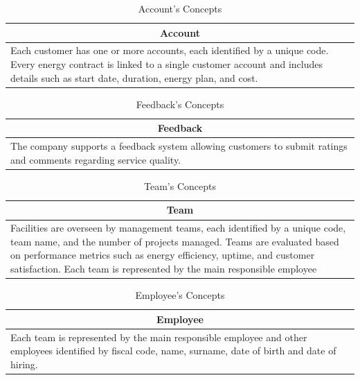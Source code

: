 \begin{table}[H]
    \renewcommand{\arraystretch}{1.3} %
    \begin{tabularx}{\textwidth}{|X|}
    \hline   \multicolumn{1}{|c|}{\textbf{Account}}    \\ \hline
    Each customer has one or more accounts, each identified by a unique code. Every energy contract is linked to a single customer account and includes details such as start date, duration, energy plan, and cost. \\ \hline
    \end{tabularx}
    \caption{Account's Concepts}
    \end{table}

\begin{table}[H]
    \renewcommand{\arraystretch}{1.3} %
    \begin{tabularx}{\textwidth}{|X|}
    \hline  \multicolumn{1}{|c|}{\textbf{Feedback}}    \\ \hline
    The company supports a feedback system allowing customers to submit ratings and comments regarding service quality. \\ \hline
    \end{tabularx}
    \caption{Feedback's Concepts}
    \end{table}

\begin{table}[H]
    \renewcommand{\arraystretch}{1.3} %
    \begin{tabularx}{\textwidth}{|X|}
    \hline  \multicolumn{1}{|c|}{\textbf{Team}}    \\ \hline
    Facilities are overseen by management teams, each identified by a unique code, team name, and the number of projects managed. Teams are evaluated based on performance metrics such as energy efficiency, uptime, and customer satisfaction. Each team is represented by the main responsible employee \\ \hline
    \end{tabularx}
    \caption{Team's Concepts}
    \end{table}

\begin{table}[H]
    \renewcommand{\arraystretch}{1.3} %
    \begin{tabularx}{\textwidth}{|X|}
    \hline  \multicolumn{1}{|c|}{\textbf{Employee}}    \\ \hline
    Each team is represented by the main responsible employee and other employees identified by fiscal code, name, surname, date of birth and date of hiring. \\ \hline
    \end{tabularx}
    \caption{Employee's Concepts}
\end{table}

